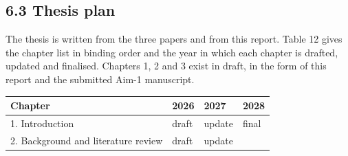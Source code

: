 \documentclass[
  11pt,
]{article}
\begin{document}
\hypertarget{thesis-plan}{%
\subsection{6.3 Thesis plan}\label{thesis-plan}}

The thesis is written from the three papers and from this report. Table
12 gives the chapter list in binding order and the year in which each
chapter is drafted, updated and finalised. Chapters 1, 2 and 3 exist in
draft, in the form of this report and the submitted Aim-1 manuscript.

\begin{longtable}[]{@{}llll@{}}
\toprule
\begin{minipage}[b]{0.58\columnwidth}\raggedright
Chapter\strut
\end{minipage} & \begin{minipage}[b]{0.10\columnwidth}\raggedright
2026\strut
\end{minipage} & \begin{minipage}[b]{0.10\columnwidth}\raggedright
2027\strut
\end{minipage} & \begin{minipage}[b]{0.10\columnwidth}\raggedright
2028\strut
\end{minipage}\tabularnewline
\midrule
\endhead
\begin{minipage}[t]{0.58\columnwidth}\raggedright
1. Introduction\strut
\end{minipage} & \begin{minipage}[t]{0.10\columnwidth}\raggedright
draft\strut
\end{minipage} & \begin{minipage}[t]{0.10\columnwidth}\raggedright
update\strut
\end{minipage} & \begin{minipage}[t]{0.10\columnwidth}\raggedright
final\strut
\end{minipage}\tabularnewline
\begin{minipage}[t]{0.58\columnwidth}\raggedright
2. Background and literature review\strut
\end{minipage} & \begin{minipage}[t]{0.10\columnwidth}\raggedright
draft\strut
\end{minipage} & \begin{minipage}[t]{0.10\columnwidth}\raggedright
update\strut
\end{minipage} & \begin{minipage}[t]{0.10\columnwidth}\raggedright

\end{minipage}
\end{longtable}
\end{document}
